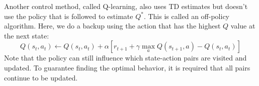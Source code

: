 Another control method, called Q-learning, also uses TD estimates but doesn't use the policy that is followed to estimate $Q^*$. This is called an off-policy algorithm. Here, we do a backup using the action that has the highest $Q$ value at the next state:
\begin{equation}
Q(s_t,a_t) \leftarrow Q(s_t,a_t) + \alpha \left[ r_{t+1} + \gamma \max_{a} Q(s_{t+1}, a) - Q(s_t,a_t) \right]
\end{equation}
Note that the policy can still influence which state-action pairs are visited and updated. To guarantee finding the optimal behavior, it is required that all pairs continue to be updated.\\

